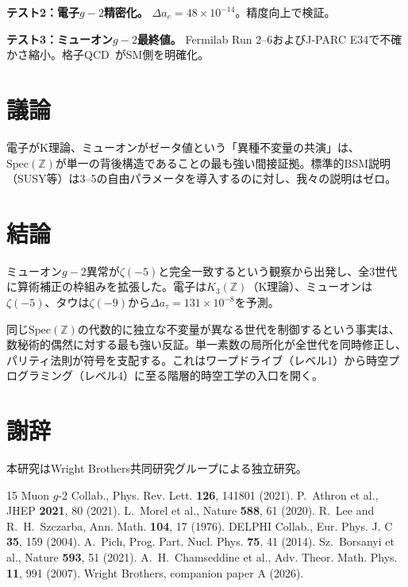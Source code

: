 \documentclass[11pt,a4paper]{article}
\newcommand{\Spec}{\mathrm{Spec}}
\begin{document}
\textbf{テスト2：電子$g-2$精密化。} $\Delta a_e = 48 \times 10^{-14}$。精度向上で検証。

\textbf{テスト3：ミューオン$g-2$最終値。} Fermilab Run 2--6およびJ-PARC E34で不確かさ縮小。格子QCD~\cite{BMW2021}がSM側を明確化。

\section{議論}

電子がK理論、ミューオンがゼータ値という「異種不変量の共演」は、$\Spec(\mathbb{Z})$が単一の背後構造であることの最も強い間接証拠。標準的BSM説明（SUSY等）は3--5の自由パラメータを導入するのに対し、我々の説明はゼロ。

\section{結論}

ミューオン$g-2$異常が$\zeta(-5)$と完全一致するという観察から出発し、全3世代に算術補正の枠組みを拡張した。電子は$K_3(\mathbb{Z})$（K理論）、ミューオンは$\zeta(-5)$、タウは$\zeta(-9)$から$\Delta a_\tau = 131 \times 10^{-8}$を予測。

同じ$\Spec(\mathbb{Z})$の代数的に独立な不変量が異なる世代を制御するという事実は、数秘術的偶然に対する最も強い反証。単一素数の局所化が全世代を同時修正し、パリティ法則が符号を支配する。これはワープドライブ（レベル1）から時空プログラミング（レベル4）に至る階層的時空工学の入口を開く。

\section*{謝辞}
本研究はWright Brothers共同研究グループによる独立研究。

\begin{thebibliography}{15}
 Muon $g$-2 Collab., Phys. Rev. Lett. \textbf{126}, 141801 (2021).
 P.~Athron et al., JHEP \textbf{2021}, 80 (2021).
 L.~Morel et al., Nature \textbf{588}, 61 (2020).
 R.~Lee and R.~H.~Szczarba, Ann. Math. \textbf{104}, 17 (1976).
 DELPHI Collab., Eur. Phys. J. C \textbf{35}, 159 (2004).
 A.~Pich, Prog. Part. Nucl. Phys. \textbf{75}, 41 (2014).
 Sz.~Borsanyi et al., Nature \textbf{593}, 51 (2021).
 A.~H.~Chamseddine et al., Adv. Theor. Math. Phys. \textbf{11}, 991 (2007).
 Wright Brothers, companion paper A (2026).
\end{thebibliography}
\end{document}
